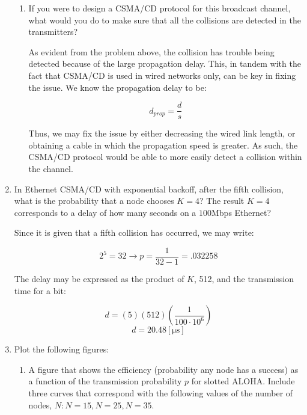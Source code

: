 \begin{enumerate}
\begin{enumerate}
        \item If you were to design a CSMA/CD protocol for this broadcast channel, what would you do to make sure that all the collisions are detected in the transmitters?

          As evident from the problem above, the collision has trouble being detected because of the large propagation delay. This, in tandem with the fact that CSMA/CD is used in wired networks only, can be key in fixing the issue. We know the propagation delay to be:

          $$d_{prop}=\frac{d}{s}$$

          Thus, we may fix the issue by either decreasing the wired link length, or obtaining a cable in which the propagation speed is greater. As such, the CSMA/CD protocol would be able to more easily detect a collision within the channel.

       \end{enumerate}

    \item In Ethernet CSMA/CD with exponential backoff, after the fifth collision, what is the probability that a node chooses $K = 4$? The result $K = 4$ corresponds to a delay of how many seconds on a $100$Mbps Ethernet?

      Since it is given that a fifth collision has occurred, we may write:

      $$\boxed{2^5=32\to p=\frac{1}{32-1}=.032258}$$

      The delay may be expressed as the product of $K$, 512, and the transmission time for a bit:

      $$d=(5)(512)\left( \frac{1}{100\cdot10^6} \right)$$
      $$\boxed{d=20.48[\si{\micro\second}]}$$

    \item Plot the following figures:

      \begin{enumerate}

          \item A figure that shows the efficiency (probability any node has a success) as a function of the transmission probability $p$ for slotted ALOHA. Include three curves that correspond with the following values of the number of nodes, $N: N=15,N=25, N=35$.


\end{enumerate}
\end{enumerate}
